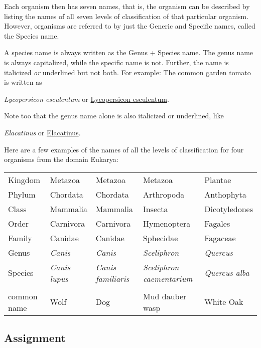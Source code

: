 \documentclass[11pt]{exam}
\begin{document}
Each organism then has seven names, that is, the organism can be
described by listing the names of all seven levels of classification of
that particular organism. However, organisms are referred to by just the
Generic and Specific names, called the Species name.

A species name is always written as the Genus + Species name. The genus
name is always capitalized, while the specific name is not. Further, the
name is italicized \emph{or} underlined but not both. For example: The
common garden tomato is written as \vspace*{\baselineskip}

\emph{Lycopersicon esculentum} or \uline{Lycopersicon esculentum}.\vspace{\baselineskip}

Note too that the genus name alone is also italicized or underlined, like \vspace{\baselineskip}

\emph{Elacatinus} or \uline{Elacatinus}.\vspace{\baselineskip}

Here are a few examples of the names of all the levels of classification
for four organisms from the domain Eukarya:

\begin{longtable}[c]{@{}lllll@{}}
\toprule
Kingdom & Metazoa & Metazoa & Metazoa & Plantae\tabularnewline
Phylum & Chordata & Chordata & Arthropoda &
Anthophyta\tabularnewline
Class & Mammalia & Mammalia & Insecta &
Dicotyledones\tabularnewline
Order & Carnivora & Carnivora & Hymenoptera &
Fagales\tabularnewline
Family & Canidae & Canidae & Sphecidae &
Fagaceae\tabularnewline
Genus & \emph{Canis} & \emph{Canis} & \emph{Sceliphron} &
\emph{Quercus}\tabularnewline
Species & \emph{Canis lupus} & \emph{Canis familiaris} &
\emph{Sceliphron caementarium} & \emph{Quercus alba}\tabularnewline
 & & & &\tabularnewline
common name & Wolf & Dog & Mud dauber wasp & White
Oak\tabularnewline
\bottomrule
\end{longtable}


\subsection*{Assignment}
\end{document}
